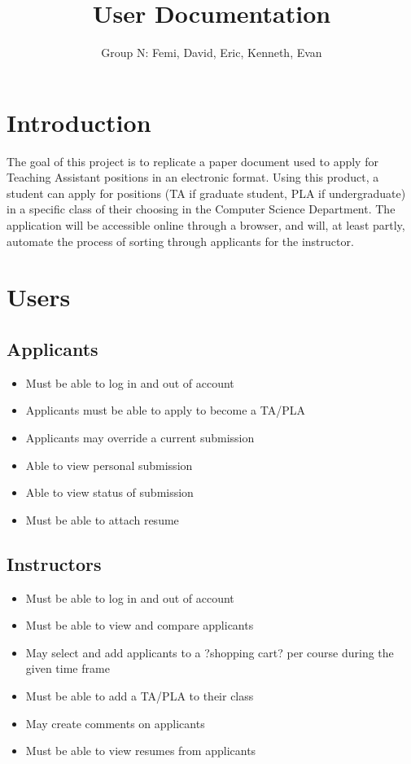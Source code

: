 \documentclass[11pt]{amsart}
\title{User Documentation}
\author{Group N: Femi, David, Eric, Kenneth, Evan}
\begin{document}
\maketitle
\section{Introduction}
\noindent The goal of this project is to replicate a paper document used to apply for Teaching Assistant positions in an electronic format. Using this product, a student can apply for positions (TA if graduate student, PLA if undergraduate) in a specific class of their choosing in the Computer Science Department. The application will be accessible online through a browser, and will, at least partly, automate the process of sorting through applicants for the instructor.
\section{Users}
\subsection{Applicants}

\begin{itemize}
    \item{Must be able to log in and out of account}
    \item{Applicants must be able to apply to become a TA/PLA}
    \item{Applicants may override a current submission}
    \item{Able to view personal submission}
    \item{Able to view status of submission}
    \item{Must be able to attach resume}
\end{itemize}

\subsection{Instructors}

\begin{itemize}
    \item{Must be able to log in and out of account}
    \item{Must be able to view and compare applicants}
    \item{May select and add applicants to a ?shopping cart? per course during the given time frame}
    \item{Must be able to add a TA/PLA to their class}
    \item{May create comments on applicants}
    \item{Must be able to view resumes from applicants}
\end{itemize}
\end{document}
